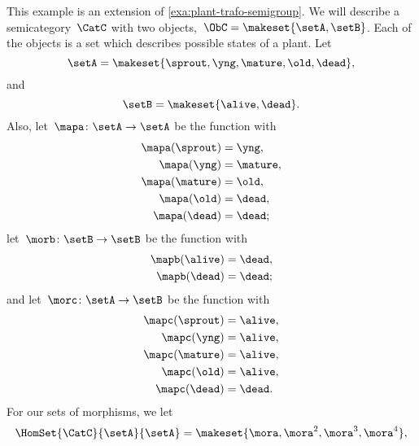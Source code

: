 \begin{example}
    \label{exa:semicat-plant-states}
    This example is an extension of \cref{exa:plant-trafo-semigroup}.
    We will describe a semicategory~$\CatC$ with two objects,~$\ObC = \makeset{ \setA, \setB }$.
    Each of the objects is a set which describes possible states of a plant.
    Let
    \begin{equation}
        \setA = \makeset{ \sprout, \yng, \mature, \old, \dead },
    \end{equation}
    and
    \begin{equation}
        \setB = \makeset{ \alive, \dead }.
    \end{equation}
    Also, let~$\mapa \colon \setA \to \setA$ be the function with
    \begin{equation}\begin{aligned}
            \mapa(\sprout) & =  \yng, \\
            \mapa(\yng)    & =  \mature, \\
            \mapa(\mature) & =  \old, \\
            \mapa( \old)   & = \dead, \\
            \mapa(\dead)   & = \dead;
        \end{aligned}\end{equation}
    let~$\morb \colon \setB \to \setB$ be the function with
    \begin{equation}\begin{aligned}
            \mapb(\alive) & =  \dead, \\
            \mapb(\dead)  & =  \dead;
        \end{aligned}\end{equation}
    and let~$\morc \colon \setA \to \setB$ be the function with
    \begin{equation}\begin{aligned}
            \mapc(\sprout) & = \alive, \\
            \mapc(\yng)    & =  \alive, \\
            \mapc(\mature) & = \alive , \\
            \mapc( \old)   & = \alive, \\
            \mapc (\dead)  & = \dead.
        \end{aligned}\end{equation}
    For our sets of morphisms, we let
    \begin{equation}\begin{aligned}
            \HomSet{\CatC}{\setA}{\setA} & = \makeset{ \mora, \mora^2, \mora^3, \mora^4 }, \\

\end{aligned}
\end{equation}
\end{example}
